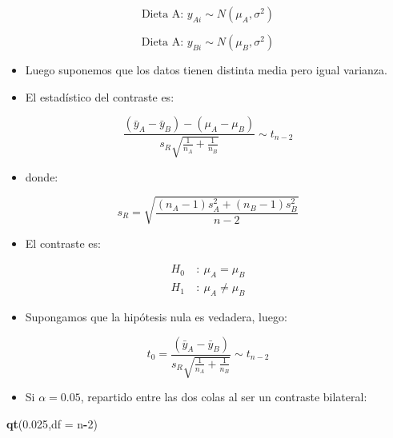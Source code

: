 \documentclass[]{article}
\newenvironment{Shaded}{\begin{snugshade}}{\end{snugshade}}
\newcommand{\KeywordTok}[1]{\textcolor[rgb]{0.13,0.29,0.53}{\textbf{#1}}}
\newcommand{\DataTypeTok}[1]{\textcolor[rgb]{0.13,0.29,0.53}{#1}}
\newcommand{\DecValTok}[1]{\textcolor[rgb]{0.00,0.00,0.81}{#1}}
\newcommand{\FloatTok}[1]{\textcolor[rgb]{0.00,0.00,0.81}{#1}}
\newcommand{\OperatorTok}[1]{\textcolor[rgb]{0.81,0.36,0.00}{\textbf{#1}}}
\newcommand{\NormalTok}[1]{#1}
\providecommand{\tightlist}{%
  \setlength{\itemsep}{0pt}\setlength{\parskip}{0pt}}
\begin{document}
\[
\text{Dieta A: } y_{Ai} \sim N(\mu_A, \sigma^2)
\]

\[
\text{Dieta A: } y_{Bi} \sim N(\mu_B, \sigma^2)
\]

\begin{itemize}
\item
  Luego suponemos que los datos tienen distinta media pero igual
  varianza.
\item
  El estadístico del contraste es:
\end{itemize}

\[
\frac{(\bar{y}_{A} - \bar{y}_{B}) - (\mu_A - \mu_B)}{s_R\sqrt{\frac{1}{n_A} + \frac{1}{n_B}}} \sim t_{n-2}
\]

\begin{itemize}
\tightlist
\item
  donde:
\end{itemize}

\[
s_R = \sqrt{ \frac{(n_A - 1)s_A^2 + (n_B - 1)s_B^2}{n - 2} }
\]

\begin{itemize}
\tightlist
\item
  El contraste es:
\end{itemize}

\[
\begin{align}
H_0 \ & : \ \mu_A = \mu_B \\
H_1 \ & : \ \mu_A \neq \mu_B
\end{align}
\]

\begin{itemize}
\tightlist
\item
  Supongamos que la hipótesis nula es vedadera, luego:
\end{itemize}

\[
t_0 = \frac{(\bar{y}_{A} - \bar{y}_{B})}{s_R\sqrt{\frac{1}{n_A} + \frac{1}{n_B}}} \sim t_{n-2}
\]

\begin{itemize}
\tightlist
\item
  Si \(\alpha = 0.05\), repartido entre las dos colas al ser un
  contraste bilateral:
\end{itemize}

\begin{Shaded}
\begin{Highlighting}[]
\KeywordTok{qt}\NormalTok{(}\FloatTok{0.025}\NormalTok{,}\DataTypeTok{df =}\NormalTok{ n}\OperatorTok{-}\DecValTok{2}\NormalTok{)}
\end{Highlighting}
\end{Shaded}
\end{document}
